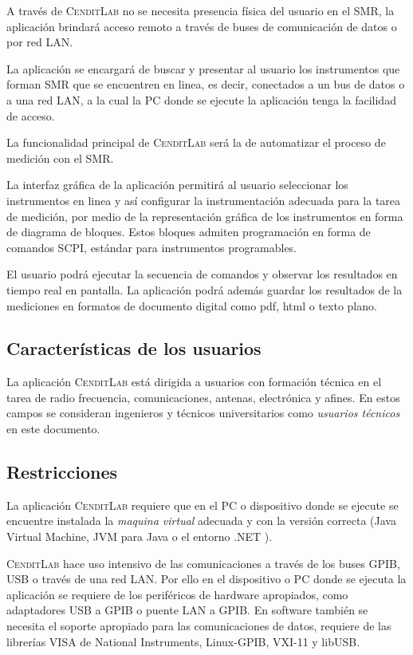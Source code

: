 \documentclass[paper=a4,oneside,fontsize=12pt]{article}
\newcommand{\AppName}{\textsc{CenditLab}\xspace}
\newcommand{\SMR}{SMR\xspace}
\begin{document}
	A través de \AppName no se necesita presencia física del usuario en el \SMR, la aplicación brindará acceso remoto a través de buses de comunicación de datos o por red LAN. 
	
	La aplicación se encargará de buscar y presentar al usuario los instrumentos que forman \SMR que se encuentren en linea, es decir, conectados a un bus de datos o a una red LAN, a la cual la PC donde se ejecute la aplicación tenga la facilidad de acceso.
	
	La funcionalidad principal de \AppName será la de automatizar el proceso de medición con el \SMR. 
	
	La interfaz gráfica de la aplicación permitirá al usuario seleccionar los instrumentos en linea y así configurar la instrumentación adecuada para la tarea de medición, por medio de la representación gráfica de los instrumentos en forma de diagrama de bloques. Estos bloques admiten programación en forma de comandos SCPI,  estándar para instrumentos programables.
	
	El usuario podrá ejecutar la secuencia de comandos y observar los resultados en tiempo real en pantalla. La aplicación podrá además guardar los resultados de la mediciones en formatos de documento digital como pdf, html o texto plano.		
	
	\subsection{Características de los usuarios}
	
	La aplicación \AppName está dirigida a usuarios con formación técnica en el tarea de radio frecuencia, comunicaciones, antenas, electrónica y afines. En estos campos se  consideran ingenieros y técnicos universitarios como \emph{usuarios técnicos} en este documento.
	
	\subsection{Restricciones}	
	
	La aplicación \AppName requiere que en el PC o dispositivo donde se ejecute se encuentre instalada la \emph{maquina virtual} adecuada y con la versión correcta (Java Virtual Machine, JVM para Java o el entorno .NET ). 
	
	\AppName hace uso intensivo de las comunicaciones a través de los buses GPIB, USB o través de una red LAN. Por ello en el dispositivo o PC donde se ejecuta la aplicación se requiere de los periféricos de hardware apropiados, como adaptadores USB a GPIB o puente LAN a GPIB. En software también se necesita el soporte apropiado para las comunicaciones de datos, requiere de las librerías VISA de National Instruments, Linux-GPIB, VXI-11 y libUSB.	
\end{document}
